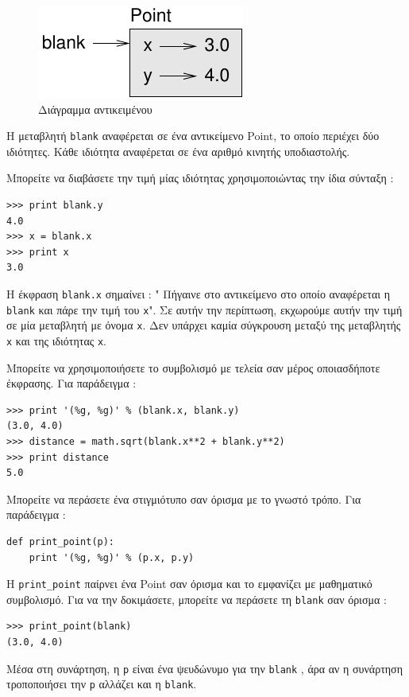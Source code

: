 \documentclass[10pt]{book}
\begin{document}
\begin{figure}
\centerline
{\includegraphics[scale=0.8]{figs/point.pdf}}
 \caption{Διάγραμμα αντικειμένου} 
\label{fig.point}
\end{figure}


 Η μεταβλητή  {\tt blank}  αναφέρεται σε ένα αντικείμενο  Point,  το οποίο περιέχει δύο ιδιότητες. Κάθε ιδιότητα αναφέρεται σε ένα αριθμό κινητής υποδιαστολής.

Μπορείτε να διαβάσετε την τιμή μίας ιδιότητας χρησιμοποιώντας την ίδια σύνταξη :

\begin{verbatim}
>>> print blank.y
4.0
>>> x = blank.x
>>> print x
3.0
\end{verbatim}
%
 Η έκφραση  {\tt blank.x}  σημαίνει : " Πήγαινε στο αντικείμενο στο οποίο αναφέρεται η  {\tt blank}  και 
πάρε την τιμή του  {\tt x}".  Σε αυτήν την περίπτωση, εκχωρούμε αυτήν την τιμή σε μία μεταβλητή με όνομα  {\tt x}.    Δεν υπάρχει καμία σύγκρουση μεταξύ της μεταβλητής  {\tt x}  και της ιδιότητας  {\tt x}.

 Μπορείτε να χρησιμοποιήσετε το συμβολισμό με τελεία σαν μέρος οποιασδήποτε έκφρασης. Για παράδειγμα :

\begin{verbatim}
>>> print '(%g, %g)' % (blank.x, blank.y)
(3.0, 4.0)
>>> distance = math.sqrt(blank.x**2 + blank.y**2)
>>> print distance
5.0
\end{verbatim}
%
 Μπορείτε να περάσετε ένα στιγμιότυπο σαν όρισμα με το γνωστό τρόπο. Για παράδειγμα :

\begin{verbatim}
def print_point(p):
    print '(%g, %g)' % (p.x, p.y)
\end{verbatim}
%
 Η  \verb"print_point"  παίρνει ένα  Point  σαν όρισμα και το εμφανίζει με μαθηματικό συμβολισμό.  Για να την δοκιμάσετε, μπορείτε να περάσετε τη  {\tt blank}  σαν όρισμα :

\begin{verbatim}
>>> print_point(blank)
(3.0, 4.0)
\end{verbatim}
%
 Μέσα στη συνάρτηση, η  {\tt p}  είναι ένα ψευδώνυμο για την  {\tt blank}  , άρα αν η συνάρτηση τροποποιήσει την  {\tt p}  αλλάζει και η  {\tt blank}.
\end{document}
